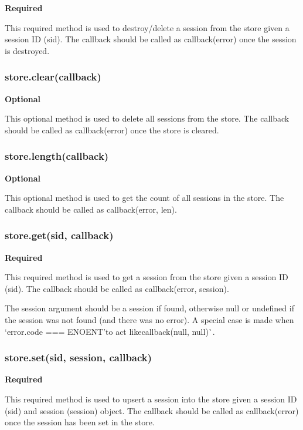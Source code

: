 {\bfseries Required}

This required method is used to destroy/delete a session from the store given a session ID ({\ttfamily sid}). The {\ttfamily callback} should be called as {\ttfamily callback(error)} once the session is destroyed.

\subsubsection*{store.\+clear(callback)}

{\bfseries Optional}

This optional method is used to delete all sessions from the store. The {\ttfamily callback} should be called as {\ttfamily callback(error)} once the store is cleared.

\subsubsection*{store.\+length(callback)}

{\bfseries Optional}

This optional method is used to get the count of all sessions in the store. The {\ttfamily callback} should be called as {\ttfamily callback(error, len)}.

\subsubsection*{store.\+get(sid, callback)}

{\bfseries Required}

This required method is used to get a session from the store given a session ID ({\ttfamily sid}). The {\ttfamily callback} should be called as {\ttfamily callback(error, session)}.

The {\ttfamily session} argument should be a session if found, otherwise {\ttfamily null} or {\ttfamily undefined} if the session was not found (and there was no error). A special case is made when `error.\+code === \textquotesingle{}E\+N\+O\+E\+NT'{\ttfamily to act like}callback(null, null)\`{}.

\subsubsection*{store.\+set(sid, session, callback)}

{\bfseries Required}

This required method is used to upsert a session into the store given a session ID ({\ttfamily sid}) and session ({\ttfamily session}) object. The callback should be called as {\ttfamily callback(error)} once the session has been set in the store.

